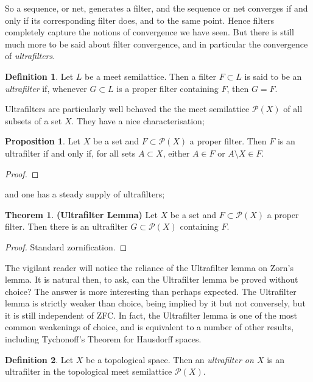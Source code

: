 \documentclass{book}
\theoremstyle{definition}
\newtheorem{theorem}{Theorem}[section]
\newtheorem{proposition}{Proposition}[section]
\newtheorem{definition}{Definition}[section]
\theoremstyle{remark}
\begin{document}
So a sequence, or net, generates a filter, and the sequence or net converges if and only if its corresponding filter does, and to the same point. Hence filters completely capture the notions of convergence we have seen. But there is still much more to be said about filter convergence, and in particular the convergence of \textit{ultrafilters}.

\begin{definition}
Let $L$ be a meet semilattice. Then a filter $F\subset L$ is said to be an \textit{ultrafilter} if, whenever $G\subset L$ is a proper filter containing $F$, then $G=F$.
\end{definition}

Ultrafilters are particularly well behaved the the meet semilattice $\mathcal P(X)$ of all subsets of a set $X$. They have a nice characterisation;

\begin{proposition}
Let $X$ be a set and $F\subset\mathcal P(X)$ a proper filter. Then $F$ is an ultrafilter if and only if, for all sets $A\subset X$, either $A\in F$ or $A\setminus X\in F.$
\end{proposition}
\begin{proof}

\end{proof}

and one has a steady supply of ultrafilters;

\begin{theorem}\textbf{(Ultrafilter Lemma)}
\label{ultrafilterlemma}\newline
Let $X$ be a set and $F\subset\mathcal P(X)$ a proper filter. Then there is an ultrafilter $G\subset\mathcal P(X)$ containing $F$.
\end{theorem}
\begin{proof}
Standard zornification.
\end{proof}

The vigilant reader will notice the reliance of the Ultrafilter lemma on Zorn's lemma. It is natural then, to ask, can the Ultrafilter lemma be proved without choice? The answer is more interesting than perhaps expected. The Ultrafilter lemma is strictly weaker than choice, being implied by it but not conversely, but it is still independent of ZFC. In fact, the Ultrafilter lemma is one of the most common weakenings of choice, and is equivalent to a number of other results, including Tychonoff's Theorem for Hausdorff spaces.

\begin{definition}
Let $X$ be a topological space. Then an \textit{ultrafilter on $X$} is an ultrafilter in the topological meet semilattice $\mathcal P(X)$.
\end{definition}
\end{document}

